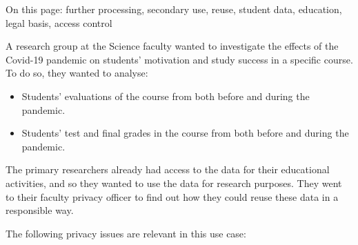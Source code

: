 \documentclass[
]{book}
\providecommand{\tightlist}{%
  \setlength{\itemsep}{0pt}\setlength{\parskip}{0pt}}
\begin{document}
On this page: further processing, secondary use, reuse, student data, education,
legal basis, access control

A research group at the Science faculty wanted to investigate the effects of the
Covid-19 pandemic on students' motivation and study success in a specific course.
To do so, they wanted to analyse:

\begin{itemize}
\tightlist
\item
  Students' evaluations of the course from both before and during the pandemic.
\item
  Students' test and final grades in the course from both before and during the pandemic.
\end{itemize}

The primary researchers already had access to the data for their educational
activities, and so they wanted to use the data for research purposes. They went
to their faculty privacy officer to find out how they could reuse these data in
a responsible way.

The following privacy issues are relevant in this use case:
\end{document}
